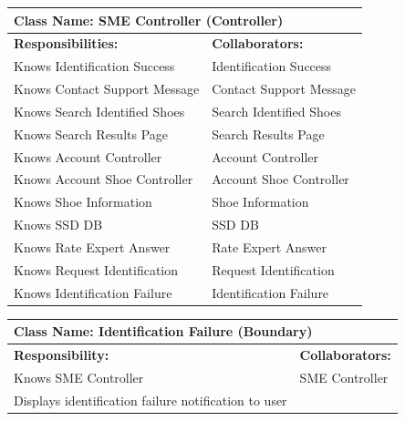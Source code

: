 \documentclass[]{article}
\begin{document}
\begin{table}[H]
    \centering
    \begin{tabular}{|p{}|p{}|}
        \hline
        \multicolumn{2}{|l|}{\textbf{Class Name:} SME Controller (Controller)} \\
        \hline
        \textbf{Responsibilities:} & \textbf{Collaborators:} \\
        \hline
        Knows Identification Success & Identification Success \\  
        Knows Contact Support Message & Contact Support Message \\  
        Knows Search Identified Shoes & Search Identified Shoes \\  
        Knows Search Results Page & Search Results Page \\  
        Knows Account Controller & Account Controller \\  
        Knows Account Shoe Controller & Account Shoe Controller \\  
        Knows Shoe Information & Shoe Information \\  
        Knows SSD DB & SSD DB \\  
        Knows Rate Expert Answer & Rate Expert Answer \\  
        Knows Request Identification & Request Identification \\  
        Knows Identification Failure & Identification Failure\\  
        \hline
    \end{tabular}
    \label{tab:sme_controller}
\end{table}

\begin{table}[H]
    \centering
    \begin{tabular}{|p{}|p{}|}
        \hline
        \multicolumn{2}{|l|}{\textbf{Class Name:} Identification Failure (Boundary)} \\
        \hline
        \textbf{Responsibility:} & \textbf{Collaborators:} \\
        \hline
        Knows SME Controller & SME Controller \\
        Displays identification failure notification to user & \\
        \hline
    \end{tabular}
    \label{tab:identification_failure}
\end{table}
\end{document}
